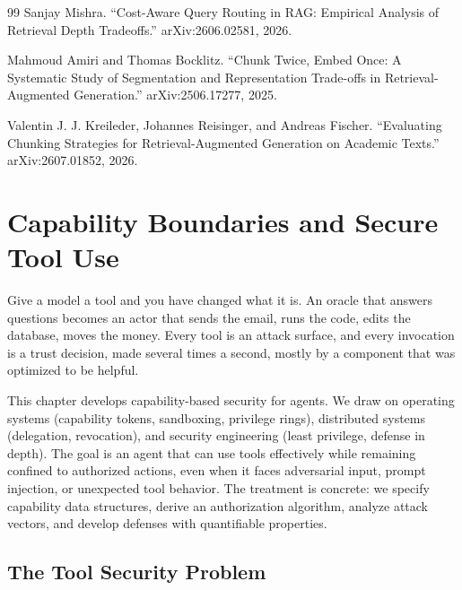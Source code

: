 \documentclass[11pt]{book}
\begin{document}
\begin{thebibliography}{99}
Sanjay Mishra.
``Cost-Aware Query Routing in RAG: Empirical Analysis of Retrieval Depth Tradeoffs.''
arXiv:2606.02581, 2026.

Mahmoud Amiri and Thomas Bocklitz.
``Chunk Twice, Embed Once: A Systematic Study of Segmentation and Representation
Trade-offs in Retrieval-Augmented Generation.''
arXiv:2506.17277, 2025.

Valentin J. J. Kreileder, Johannes Reisinger, and Andreas Fischer.
``Evaluating Chunking Strategies for Retrieval-Augmented Generation on Academic Texts.''
arXiv:2607.01852, 2026.
\end{thebibliography}


\chapter{Capability Boundaries and Secure Tool Use}
\label{ch:capability}

Give a model a tool and you have changed what it is. An oracle that answers questions becomes an actor that sends the email, runs the code, edits the database, moves the money. Every tool is an attack surface, and every invocation is a trust decision, made several times a second, mostly by a component that was optimized to be helpful.

This chapter develops capability-based security for agents. We draw on operating systems (capability tokens, sandboxing, privilege rings), distributed systems (delegation, revocation), and security engineering (least privilege, defense in depth). The goal is an agent that can use tools effectively while remaining confined to authorized actions, even when it faces adversarial input, prompt injection, or unexpected tool behavior. The treatment is concrete: we specify capability data structures, derive an authorization algorithm, analyze attack vectors, and develop defenses with quantifiable properties.

\section{The Tool Security Problem}
\end{document}
